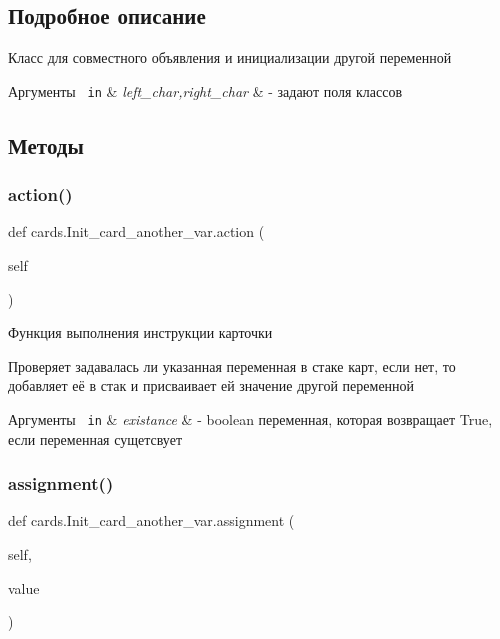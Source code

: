 \subsection{Подробное описание}
Класс для совместного объявления и инициализации другой переменной 


\begin{DoxyParams}[1]{Аргументы}
\mbox{\texttt{ in}}  & {\em left\+\_\+char,right\+\_\+char} & -\/ задают поля классов \\
\hline
\end{DoxyParams}


\subsection{Методы}
\mbox{\label{classcards_1_1_init__card__another__var_a9afc4a0fc3e75aa914ac121fe626652e}} 
\subsubsection{\texorpdfstring{action()}{action()}}
{\footnotesize\ttfamily def cards.\+Init\+\_\+card\+\_\+another\+\_\+var.\+action (\begin{DoxyParamCaption}\item[{}]{self }\end{DoxyParamCaption})}



Функция выполнения инструкции карточки 

Проверяет задавалась ли указанная переменная в стаке карт, если нет, то добавляет её в стак и присваивает ей значение другой переменной 
\begin{DoxyParams}[1]{Аргументы}
\mbox{\texttt{ in}}  & {\em existance} & -\/ boolean переменная, которая возвращает True, если переменная сущетсвует \\
\hline
\end{DoxyParams}
\mbox{\label{classcards_1_1_init__card__another__var_ab1f64b363329c2bfdcdd26a92cda6971}} 
\subsubsection{\texorpdfstring{assignment()}{assignment()}}
{\footnotesize\ttfamily def cards.\+Init\+\_\+card\+\_\+another\+\_\+var.\+assignment (\begin{DoxyParamCaption}\item[{}]{self,  }\item[{}]{value }\end{DoxyParamCaption})}



